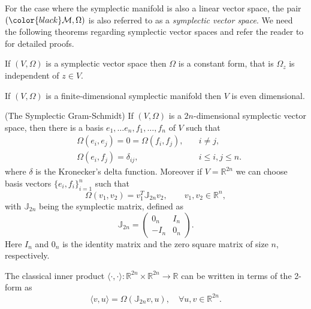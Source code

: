 \documentclass[final]{siamart}
\begin{document}
For the case where the symplectic manifold is also a linear vector space, the pair $({{\color{black}} \mathcal M},\Omega)$ is also referred to as a \emph{symplectic vector space}. We {{\color{black}} need} the following theorems regarding symplectic vector spaces and refer the reader to \cite{de2006symplectic,Marsden:1999ck,de2006symplectic,Silva01lectureson} for detailed proofs.

{{\color{black}}
\begin{theorem} \label{theorem:Hasy:1.1} \cite{Marsden:1999ck}
If $(V,\Omega)$ is a symplectic vector space then $\Omega$ is a constant form, that is $\Omega_z$ is independent of $z\in V$. 
\end{theorem}
\begin{theorem} \label{theorem:Hasy:1.2} \cite{Marsden:1999ck}
If $(V,\Omega)$ is a finite-dimensional symplectic manifold then $V$ is even dimensional.
\end{theorem}
\begin{theorem} \label{theorem:Hasy:1.3} \cite{de2006symplectic}
(The Symplectic Gram-Schmidt) If $(V,\Omega)$ is a $2n$-dimensional symplectic vector space, then there is a basis $e_1,\dots e_n,f_1, \dots , f_n$ of $V$ such that
\begin{equation} \label{eq:Hasy:4}
\begin{aligned}
	& \Omega(e_i,e_j) = 0 = \Omega(f_i,f_j), \quad & i\neq j,\\
	& \Omega(e_i,f_j) = \delta_{ij}, & i\leq i,j \leq n.
\end{aligned}
\end{equation}
where $\delta$ is the Kronecker's delta function. Moreover if $V = \mathbb{R}^{2n}$ we can choose basis vectors $\{e_i,f_i\}_{i=1}^n$ such that
\begin{equation} \label{eq:Hasy:5}
	\Omega(v_1,v_2) = v_1^T \mathbb J_{2n} v_2, \qquad v_1,v_2\in \mathbb R^n,
\end{equation}
with $\mathbb J_{2n}$ being the symplectic matrix, defined as
\begin{equation} \label{eq:Hasy:6}
	\mathbb{J}_{2n} = 
	\begin{pmatrix}
		0_n & I_n \\
		-I_n & 0_n
	\end{pmatrix}.
\end{equation}
Here $I_n$ and $0_n$ is the identity matrix and the zero square matrix of size $n$, respectively.
\end{theorem}
\begin{theorem} \label{theorem:Hasy:1.4} \cite{Marsden:1999ck}
The classical inner product $\langle \cdot,\cdot \rangle:\mathbb R^{2n}\times \mathbb R^{2n}\to \mathbb R$ can be written in terms of the 2-form as
\begin{equation}
	\langle v,u \rangle = \Omega(\mathbb J_{2n}v,u),\quad \forall u,v \in \mathbb R^{2n}.
\end{equation}
\end{theorem}
}
\end{document}

